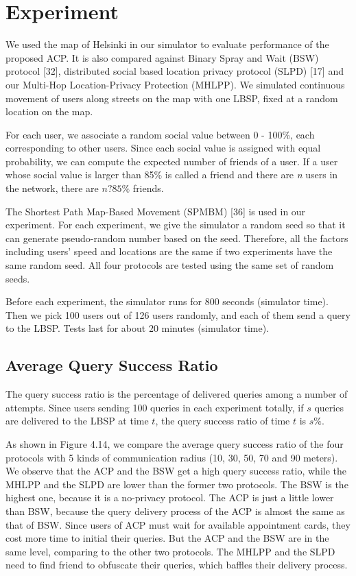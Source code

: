 
\section{ Experiment}

\noindent We used the map of Helsinki in our simulator to evaluate performance of the proposed ACP. It is also compared against Binary Spray and Wait (BSW) protocol [32], distributed social based location privacy protocol (SLPD) [17] and our Multi-Hop Location-Privacy Protection (MHLPP). We simulated continuous movement of users along streets on the map with one LBSP, fixed at a random location on the map.

For each user, we associate a random social value between 0 - 100\%, each corresponding to other users. Since each social value is assigned with equal probability, we can compute the expected number of friends of a user. If a user whose social value is larger than 85\% is called a friend and there are \textit{n} users in the network, there are $n\mathrm{?}85\%$ friends.

The Shortest Path Map-Based Movement (SPMBM) [36] is used in our experiment. For each experiment, we give the simulator a random seed so that it can generate pseudo-random number based on the seed. Therefore, all the factors including users' speed and locations are the same if two experiments have the same random seed. All four protocols are tested using the same set of random seeds.

Before each experiment, the simulator runs for 800 seconds (simulator time). Then we pick 100 users out of 126 users randomly, and each of them send a query to the LBSP. Tests last for about 20 minutes (simulator time). 


\subsection{  Average Query Success Ratio}

\noindent The query success ratio is the percentage of delivered queries among a number of attempts. Since users sending 100 queries in each experiment totally, if $s$ queries are delivered to the LBSP at time $t$, the query success ratio of time $t$ is $s\%$.

As shown in Figure 4.14, we compare the average query success ratio of the four protocols with 5 kinds of communication radius (10, 30, 50, 70 and 90 meters). We observe that the ACP and the BSW get a high query success ratio, while the MHLPP and the SLPD are lower than the former two protocols. The BSW is the highest one, because it is a no-privacy protocol. The ACP is just a little lower than BSW, because the query delivery process of the ACP is almost the same as that of BSW. Since users of ACP must wait for available appointment cards, they cost more time to initial their queries. But the ACP and the BSW are in the same level, comparing to the other two protocols. The MHLPP and the SLPD need to find friend to obfuscate their queries, which baffles their delivery process.


